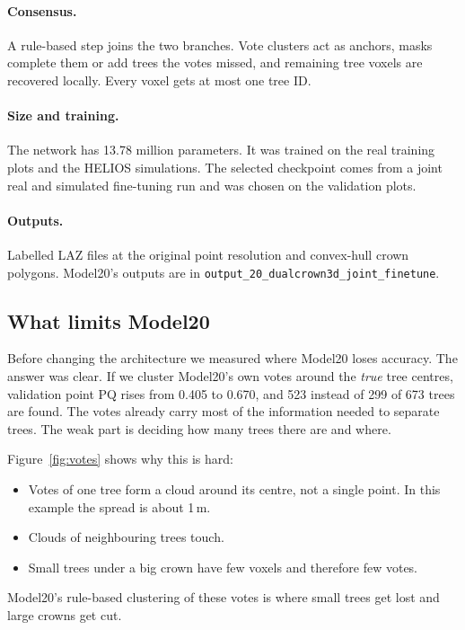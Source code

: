 \documentclass[11pt,a4paper]{article}
\newcommand{\code}[1]{\texttt{#1}}
\begin{document}
\paragraph{Consensus.} A rule-based step joins the two branches. Vote clusters act as anchors, masks complete them or add trees the votes missed, and remaining tree voxels are recovered locally. Every voxel gets at most one tree ID.

\paragraph{Size and training.} The network has 13.78 million parameters. It was trained on the real training plots and the HELIOS simulations. The selected checkpoint comes from a joint real and simulated fine-tuning run and was chosen on the validation plots.

\paragraph{Outputs.} Labelled LAZ files at the original point resolution and convex-hull crown polygons. Model20's outputs are in \code{output\_20\_dualcrown3d\_joint\_finetune}.

\subsection{What limits Model20}
\label{sec:bottleneck}

Before changing the architecture we measured where Model20 loses accuracy. The answer was clear. If we cluster Model20's own votes around the \emph{true} tree centres, validation point PQ rises from 0.405 to 0.670, and 523 instead of 299 of 673 trees are found. The votes already carry most of the information needed to separate trees. The weak part is deciding how many trees there are and where.

Figure~\ref{fig:votes} shows why this is hard:
\begin{itemize}
  \item Votes of one tree form a cloud around its centre, not a single point. In this example the spread is about 1\,m.
  \item Clouds of neighbouring trees touch.
  \item Small trees under a big crown have few voxels and therefore few votes.
\end{itemize}
Model20's rule-based clustering of these votes is where small trees get lost and large crowns get cut.
\end{document}
